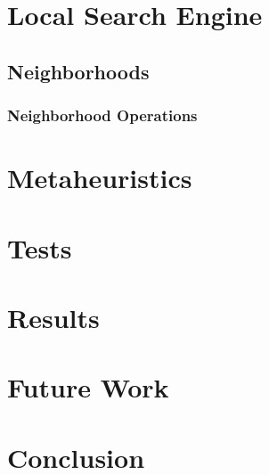 \documentclass[a4paper,11pt]{article}
\begin{document}
\section{Local Search Engine} \label{sec_local}
  \subsection{Neighborhoods}
    \subsubsection{Neighborhood Operations}
\section{Metaheuristics}
\section{Tests}
\section{Results}
\section{Future Work}
  
\section{Conclusion}
\end{document}
